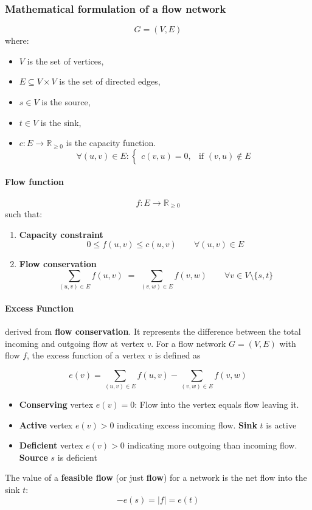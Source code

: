\documentclass[12pt, openany]{article}
\begin{document}
\subsubsection{Mathematical formulation of a flow network}
\[
G = (V,E)
\]
where:
\begin{itemize}
    \item \(V\) is the set of vertices,
    \item \(E \subseteq V \times V\) is the set of directed edges,
    \item \(s \in V\) is the source,
    \item \(t \in V\) is the sink,
    \item \(c : E \to \mathbb{R}_{\ge 0}\) is the capacity function.
        \[
        \forall (u,v) \in E :
        \begin{cases}
        c(v,u) = 0, & \text{if } (v,u) \notin E
        \end{cases}
    \]
\end{itemize}

\paragraph{Flow function}
\[
f : E \to \mathbb{R}_{\ge 0}
\]
such that:

\begin{enumerate}
    \item \textbf{Capacity constraint}
    \[
    0 \le f(u,v) \le c(u,v)
    \qquad \forall (u,v)\in E
    \]

    \item \textbf{Flow conservation}
    \[
    \sum_{(u,v)\in E} f(u,v)
    \;=\;
    \sum_{(v,w)\in E} f(v,w)
    \qquad \forall v \in V \setminus \{s,t\}
    \]
\end{enumerate}
\paragraph{Excess Function} derived from \textbf{flow conservation}. It represents the difference between the total incoming and outgoing flow at vertex \(v\). For a flow network \(G = (V,E)\) with flow \(f\), the excess function of a vertex \(v\) is defined as

\[
e(v) =
\sum_{(u,v)\in E} f(u,v)
-
\sum_{(v,w)\in E} f(v,w)
\]



\begin{itemize}

\item \textbf{Conserving} vertex \(e(v) = 0\): Flow into the vertex equals flow leaving it.
\item \textbf{Active} vertex \(e(v) > 0\) indicating excess incoming flow. \textbf{Sink} \(t\) is active
\item \textbf{Deficient} vertex \(e(v) > 0\) indicating more outgoing than incoming flow. \textbf{Source} \(s\) is deficient


\end{itemize}
The value of a \textbf{feasible flow} (or just \textbf{flow}) for a network is the net flow into the sink \(t\):
\[
-e(s) = |f| = e(t)
\]
\end{document}
